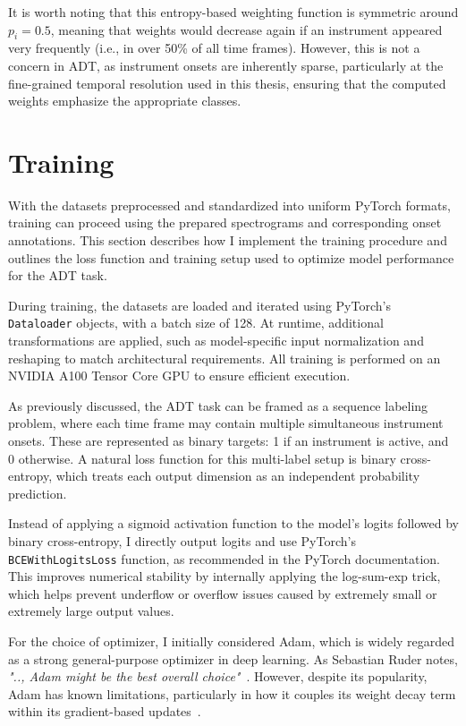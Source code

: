 It is worth noting that this entropy-based weighting function is symmetric around $p_i = 0.5$, meaning that weights would decrease again if an instrument appeared very frequently (i.e., in over 50\% of all time frames). However, this is not a concern in \gls{ADT}, as instrument onsets are inherently sparse, particularly at the fine-grained temporal resolution used in this thesis, ensuring that the computed weights emphasize the appropriate classes.

\section{Training}

With the datasets preprocessed and standardized into uniform PyTorch formats, training can proceed using the prepared spectrograms and corresponding onset annotations. This section describes how I implement the training procedure and outlines the loss function and training setup used to optimize model performance for the \gls{ADT} task.

During training, the datasets are loaded and iterated using PyTorch's \texttt{Dataloader} objects, with a batch size of 128. At runtime, additional transformations are applied, such as model-specific input normalization and reshaping to match architectural requirements. All training is performed on an NVIDIA A100 Tensor Core GPU to ensure efficient execution.

As previously discussed, the \gls{ADT} task can be framed as a sequence labeling problem, where each time frame may contain multiple simultaneous instrument onsets. These are represented as binary targets: 1 if an instrument is active, and 0 otherwise. A natural loss function for this multi-label setup is binary cross-entropy, which treats each output dimension as an independent probability prediction. 

Instead of applying a sigmoid activation function to the model's logits followed by binary cross-entropy, I directly output logits and use PyTorch's \texttt{BCEWithLogitsLoss} function, as recommended in the PyTorch documentation. This improves numerical stability by internally applying the log-sum-exp trick, which helps prevent underflow or overflow issues caused by extremely small or extremely large output values.

For the choice of optimizer, I initially considered Adam, which is widely regarded as a strong general-purpose optimizer in deep learning. As Sebastian Ruder notes, \textit{".., Adam might be the best overall choice"}~\cite{ruder2017overviewgradientdescentoptimization}. However, despite its popularity, Adam has known limitations, particularly in how it couples its weight decay term within its gradient-based updates~\cite{kingma2017adammethodstochasticoptimization, bock2018improvementconvergenceproofadamoptimizer}.

